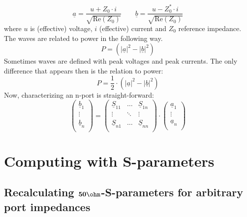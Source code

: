 \documentclass[10pt]{report}
\begin{document}
\begin{equation}
\underline{a} = \frac{u+Z_0\cdot i}{\sqrt{\text{Re}(Z_0)}} \qquad
\underline{b} = \frac{u-Z_0^*\cdot i}{\sqrt{\text{Re}(Z_0)}}
\label{equ:waves}
\end{equation}
where $u$ is (effective) voltage, $i$ (effective) current and $Z_0$ reference
impedance. The waves are related to power in the following way.
\begin{equation}
P = \left( |\underline{a}|^2 - |\underline{b}|^2 \right)
\end{equation}
Sometimes waves are defined with peak voltages and peak currents.
The only difference that appears then is the relation to power:
\begin{equation}
P = \frac{1}{2}\cdot \left( |\underline{a}|^2 - |\underline{b}|^2 \right)
\end{equation}
Now, characterizing an n-port is straight-forward:
\begin{equation}
\begin{pmatrix}
\underline{b}_1\\
\vdots\\
\underline{b}_n\\
\end{pmatrix}
=
\begin{pmatrix}
\underline{S}_{11} & \ldots & \underline{S}_{1n}\\
\vdots & \ddots & \vdots\\
\underline{S}_{n1} & \ldots & \underline{S}_{nn}\\
\end{pmatrix}
\cdot
\begin{pmatrix}
\underline{a}_1\\
\vdots\\
\underline{a}_n\\
\end{pmatrix}
\end{equation}


\section{Computing with S-parameters}

\subsection{Recalculating $\mathbf{50\ohm}$-S-parameters for arbitrary port impedances}
\end{document}
